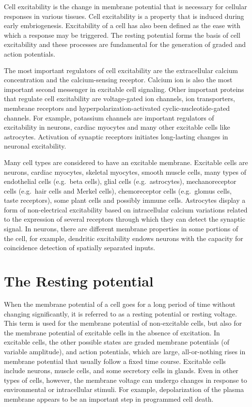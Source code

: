 Cell excitability is the change in membrane potential that is necessary for cellular responses in various tissues. Cell excitability is a property that is induced during early embriogenesis. Excitability of a cell has also been defined as the ease with which a response may be triggered. The resting potential forms the basis of cell excitability and these processes are fundamental for the generation of graded and action potentials.

The most important regulators of cell excitability are the extracellular calcium concentration and the calcium-sensing receptor. Calcium ion is also the most important second messenger in excitable cell signaling. Other important proteins that regulate cell excitability are voltage-gated ion channels, ion transporters, membrane receptors and hyperpolarization-activated cyclic-nucleotide-gated channels. For example, potassium channels are important regulators of excitability in neurons, cardiac myocytes and many other excitable cells like astrocytes. Activation of synaptic receptors initiates long-lasting changes in neuronal excitability.

Many cell types are considered to have an excitable membrane. Excitable cells are neurons, cardiac myocytes, skeletal myocytes, smooth muscle cells, many types of endothelial cells (e.g.~beta cells), glial cells (e.g.~astrocytes), mechanoreceptor cells (e.g.~hair cells and Merkel cells), chemoreceptor cells (e.g.~glomus cells, taste receptors), some plant cells and possibly immune cells. Astrocytes display a form of non-electrical excitability based on intracellular calcium variations related to the expression of several receptors through which they can detect the synaptic signal. In neurons, there are different membrane properties in some portions of the cell, for example, dendritic excitability endows neurons with the capacity for coincidence detection of spatially separated inputs.

\hypertarget{the-resting-potential}{%
\section{The Resting potential}\label{the-resting-potential}}

When the membrane potential of a cell goes for a long period of time without changing significantly, it is referred to as a resting potential or resting voltage. This term is used for the membrane potential of non-excitable cells, but also for the membrane potential of excitable cells in the absence of excitation. In excitable cells, the other possible states are graded membrane potentials (of variable amplitude), and action potentials, which are large, all-or-nothing rises in membrane potential that usually follow a fixed time course. Excitable cells include neurons, muscle cells, and some secretory cells in glands. Even in other types of cells, however, the membrane voltage can undergo changes in response to environmental or intracellular stimuli. For example, depolarization of the plasma membrane appears to be an important step in programmed cell death.

